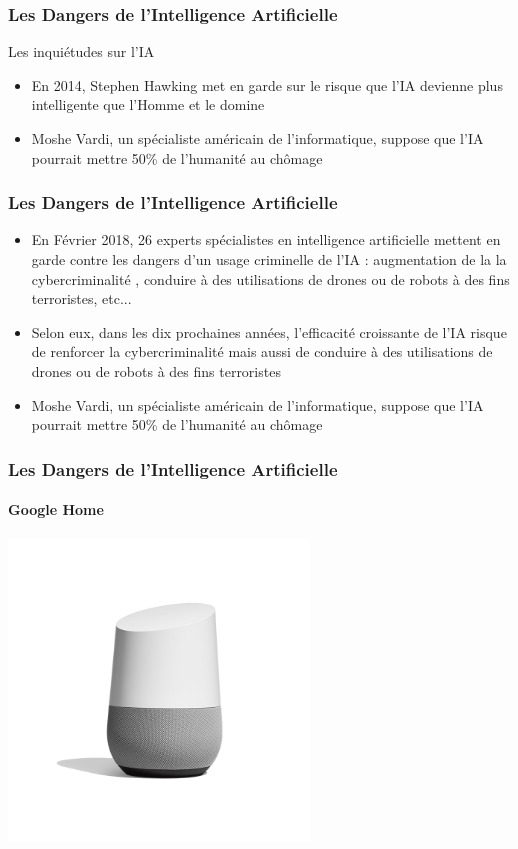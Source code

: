 \documentclass{beamer}
\begin{document}
	
	\begin{frame}[fragile]
	\frametitle{Les Dangers de l'Intelligence Artificielle}
	\begin{block}{Les inquiétudes sur l'IA}
	\begin{itemize}
	\itemsep1em
		\item En 2014, Stephen Hawking met en garde sur le risque que l'IA devienne plus intelligente que l'Homme et le domine
		\item Moshe Vardi, un spécialiste américain de l'informatique, suppose que l'IA pourrait mettre 50\% de l'humanité au chômage
		\end{itemize}
	\end{block}

	\end{frame}
	
	\begin{frame}[fragile]
	\frametitle{Les Dangers de l'Intelligence Artificielle}
	\begin{itemize}
	\itemsep1em
		\item En Février 2018, 26 experts spécialistes en intelligence artificielle mettent en garde contre les dangers d'un usage criminelle de l'IA : augmentation de la la cybercriminalité , conduire à des utilisations de drones ou de robots à des fins terroristes, etc...
		\item Selon eux, dans les dix prochaines années, l'efficacité croissante de l'IA risque de renforcer la cybercriminalité mais aussi de conduire à des utilisations de drones ou de robots à des fins terroristes
		\item Moshe Vardi, un spécialiste américain de l'informatique, suppose que l'IA pourrait mettre 50\% de l'humanité au chômage
		\end{itemize}
	\end{frame}

	\begin{frame}[fragile]
	\frametitle{Les Dangers de l'Intelligence Artificielle}
	\framesubtitle{Google Home}
	\centerline{\includegraphics[height=8cm]{googlehome.png}}
	\end{frame}
	
\end{document}
